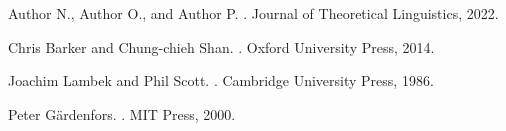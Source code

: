 \documentclass[12pt]{article}
\theoremstyle{plain}
\theoremstyle{definition}
\begin{document}

\begin{thebibliography}{10}

Author N., Author O., and Author P.
.
\newblock Journal of Theoretical Linguistics, 2022.

Chris Barker and Chung-chieh Shan.
.
\newblock Oxford University Press, 2014.

Joachim Lambek and Phil Scott.
.
\newblock Cambridge University Press, 1986.

Peter G\"{a}rdenfors.
.
\newblock MIT Press, 2000.

\end{thebibliography}
\end{document}
